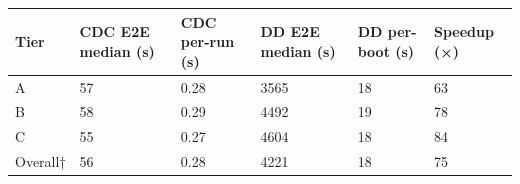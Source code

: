 \begin{tabular}{llllll}
\toprule
Tier & CDC E2E median (s) & CDC per-run (s) & DD E2E median (s) & DD per-boot (s) & Speedup (×) \\
\midrule
A & 57 & 0.28 & 3565 & 18 & 63 \\
B & 58 & 0.29 & 4492 & 19 & 78 \\
C & 55 & 0.27 & 4604 & 18 & 84 \\
Overall† & 56 & 0.28 & 4221 & 18 & 75 \\
\bottomrule
\end{tabular}
